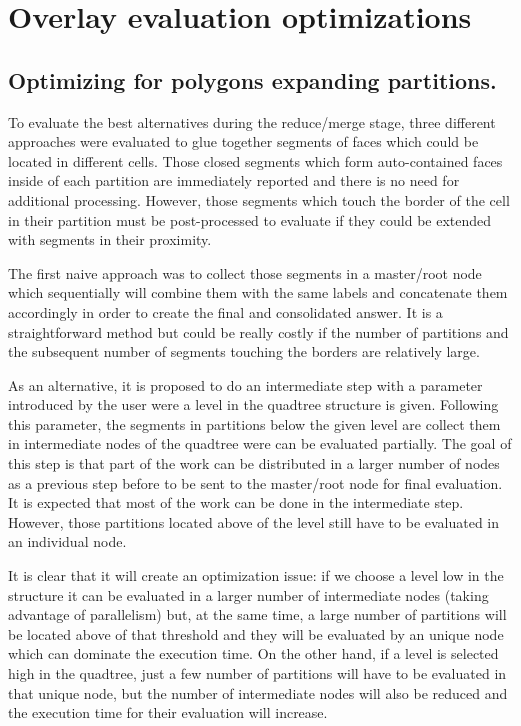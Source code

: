 \section{Overlay evaluation optimizations}\label{sec:alternative_methods}
\subsection{Optimizing for polygons expanding partitions.}\label{sec:optimizing}
To evaluate the best alternatives during the reduce/merge stage, three different approaches were evaluated to glue together segments of faces which could be located in different cells.  Those closed segments which form auto-contained faces inside of each partition are immediately reported and there is no need for additional processing.  However, those segments which touch the border of the cell in their partition must be post-processed to evaluate if they could be extended with segments in their proximity.

The first naive approach was to collect those segments in a master/root node which sequentially will combine them with the same labels and concatenate them accordingly in order to create the final and consolidated answer.  It is a straightforward method but could be really costly if the number of partitions and the subsequent number of segments touching the borders are relatively large.

As an alternative, it is proposed to do an intermediate step with a parameter introduced by the user were a level in the quadtree structure is given.  Following this parameter, the segments in partitions below the given level are collect them in intermediate nodes of the quadtree were can be evaluated partially.  The goal of this step is that part of the work can be distributed in a larger number of nodes as a previous step before to be sent to the master/root node for final evaluation.  It is expected that most of the work can be done in the intermediate step.  However, those partitions located above of the level still have to be evaluated in an individual node.

It is clear that it will create an optimization issue: if we choose a level low in the structure it can be evaluated in a larger number of intermediate nodes (taking advantage of parallelism) but, at the same time, a large number of partitions will be located above of that threshold and they will be evaluated by an unique node which can dominate the execution time.  On the other hand, if a level is selected high in the quadtree, just a few number of partitions will have to be evaluated in that unique node, but the number of intermediate nodes will also be reduced and the execution time for their evaluation will increase.

